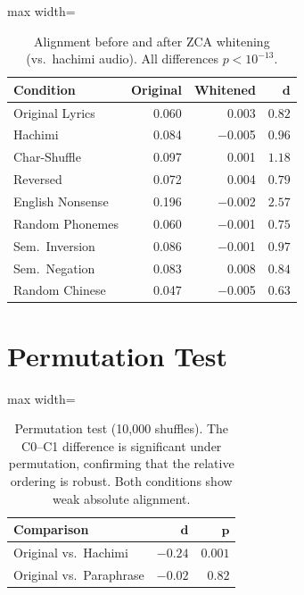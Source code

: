 \documentclass[11pt]{article}
\begin{document}
\begin{table}[!h]
\centering
\caption{Alignment before and after ZCA whitening (vs.\ hachimi audio). All differences $p{<}10^{-13}$.}
\label{tab:whitening}
\small
\begin{adjustbox}{max width=\columnwidth}
\begin{tabular}{l r r r}
\toprule
\textbf{Condition} & \textbf{Original} & \textbf{Whitened} & $\boldsymbol{d}$ \\
\midrule
Original Lyrics   & 0.060 & 0.003 & $0.82$ \\
Hachimi            & 0.084 & $-$0.005 & $0.96$ \\
Char-Shuffle       & 0.097 & 0.001 & $1.18$ \\
Reversed           & 0.072 & 0.004 & $0.79$ \\
English Nonsense   & 0.196 & $-$0.002 & $2.57$ \\
Random Phonemes    & 0.060 & $-$0.001 & $0.75$ \\
Sem.\ Inversion    & 0.086 & $-$0.001 & $0.97$ \\
Sem.\ Negation     & 0.083 & 0.008 & $0.84$ \\
Random Chinese     & 0.047 & $-$0.005 & $0.63$ \\
\bottomrule
\end{tabular}
\end{adjustbox}
\end{table}

\section{Permutation Test}\label{app:permutation}

\begin{table}[!h]
\centering
\caption{Permutation test (10{,}000 shuffles). The C0--C1 difference is significant under permutation, confirming that the relative ordering is robust. Both conditions show weak absolute alignment.}
\label{tab:permutation}
\small
\begin{adjustbox}{max width=\columnwidth}
\begin{tabular}{l r r}
\toprule
\textbf{Comparison} & $\boldsymbol{d}$ & $\boldsymbol{p}$ \\
\midrule
Original vs.\ Hachimi & $-0.24$ & $0.001$ \\
Original vs.\ Paraphrase & $-0.02$ & $0.82$ \\
\bottomrule
\end{tabular}
\end{adjustbox}
\end{table}
\end{document}
